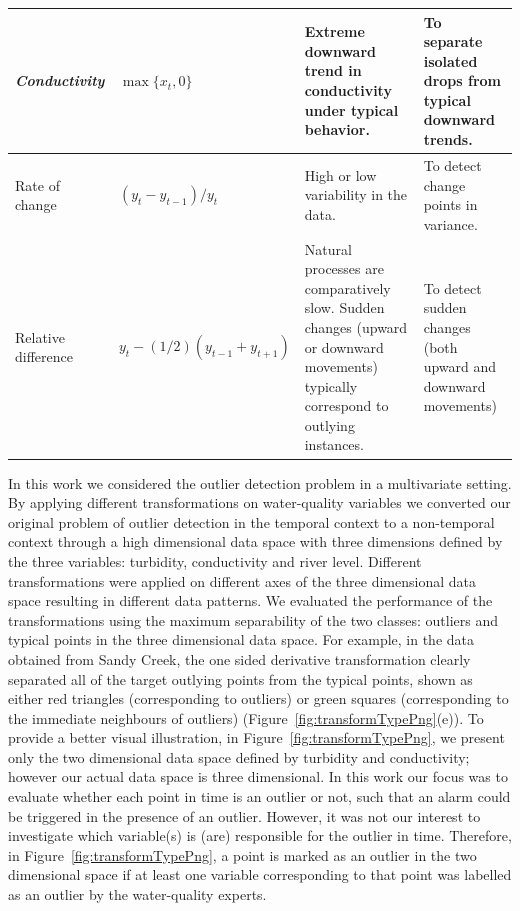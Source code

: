 \documentclass[draft]{agujournal2018} %
\begin{document}
\begin{table}[!htbp]
\begin{tabular}{p{3cm}p{3cm}p{4cm}p{4cm}}
\quad   \textit{Conductivity}
  & $\max\{x_t, 0\}$
  & Extreme downward trend in conductivity under typical behavior.
  & To separate isolated drops from typical downward trends.
\\\midrule
Rate of change
  & $(y_{t} - y_{t-1}) / y_{t}$
  & High or low variability in the data.
  & To detect change points in variance.
  \\\midrule
Relative difference
  & $y_{t} - (1/2)(y_{t-1} + y_{t+1})$
  &Natural processes are comparatively slow. Sudden changes (upward or downward movements) typically correspond to outlying instances.
  & To detect sudden changes (both upward and downward movements)
\\\bottomrule
\end{tabular}
\end{table}

In this work we considered the outlier detection problem in a
multivariate setting. By applying different transformations on
water-quality variables we converted our original problem of outlier
detection in the temporal context to a non-temporal context through a
high dimensional data space \color{black} with three dimensions defined by the three variables: turbidity, conductivity and river level.
Different transformations were applied on different axes of the three dimensional data space resulting in different data patterns. We evaluated the performance
of the transformations \citep{dang2014transforming} using the
maximum separability of the two classes: outliers and typical points in the three dimensional data space. For example, in the data obtained from Sandy Creek, the one sided derivative transformation clearly separated all of the target outlying points from the typical points, shown as either red triangles (corresponding to outliers) or green squares (corresponding to the immediate neighbours of outliers)  (Figure~\ref{fig:transformTypePng}(e)). To provide a better visual illustration, in Figure~\ref{fig:transformTypePng}, we present only the two dimensional data space defined by turbidity and conductivity; however our actual data space is three dimensional. In this work our focus was to evaluate whether each point in time is an outlier or not, such that an alarm could be triggered in the presence of an outlier. However, it was not our interest to investigate which variable(s) is (are) responsible for the outlier in time. Therefore, in Figure~\ref{fig:transformTypePng}, a point is marked as an outlier in the two dimensional space if at least one variable corresponding to that point was labelled as an outlier by the water-quality experts. \color{black}
\end{document}
